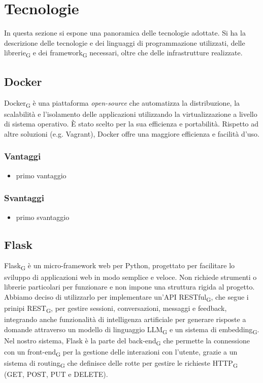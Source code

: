 \section{Tecnologie }
In questa sezione si espone una panoramica delle tecnologie adottate. Si ha la descrizione delle tecnologie e dei linguaggi di programmazione utilizzati, delle librerie\textsubscript{G} e dei framework\textsubscript{G} necessari, oltre che delle infrastrutture realizzate. 
\subsection{Docker}
Docker\textsubscript{G} è una piattaforma \textit{open-source} che automatizza la distribuzione, la scalabilità e l’isolamento delle applicazioni utilizzando la virtualizzazione a livello di sistema operativo. È stato scelto per la sua efficienza e portabilità. Rispetto ad altre soluzioni (e.g. Vagrant), Docker offre una maggiore efficienza e facilità d’uso.
\subsubsection{Vantaggi}
\begin{itemize}
    \item primo vantaggio
\end{itemize}
\subsubsection{Svantaggi}
\begin{itemize}
    \item primo svantaggio
\end{itemize}
\subsection{Flask}
Flask\textsubscript{G} è un micro-framework web per Python, progettato per facilitare lo sviluppo di applicazioni web in modo semplice e veloce. Non richiede strumenti o librerie particolari per funzionare e non impone una struttura rigida al progetto. Abbiamo deciso di utilizzarlo per implementare un'API RESTful\textsubscript{G}, che segue i prinipi REST\textsubscript{G}, per gestire sessioni, conversazioni, messaggi e feedback, integrando anche funzionalità di intelligenza artificiale per generare risposte a domande attraverso un modello di linguaggio LLM\textsubscript{G} e un sistema di embedding\textsubscript{G}. Nel nostro sistema, Flask è la parte del back-end\textsubscript{G} che permette la connessione con un front-end\textsubscript{G} per la gestione delle interazioni con l'utente, grazie a un sistema di routing\textsubscript{G} che definisce delle rotte per gestire le richieste HTTP\textsubscript{G} (GET, POST, PUT e DELETE). 
